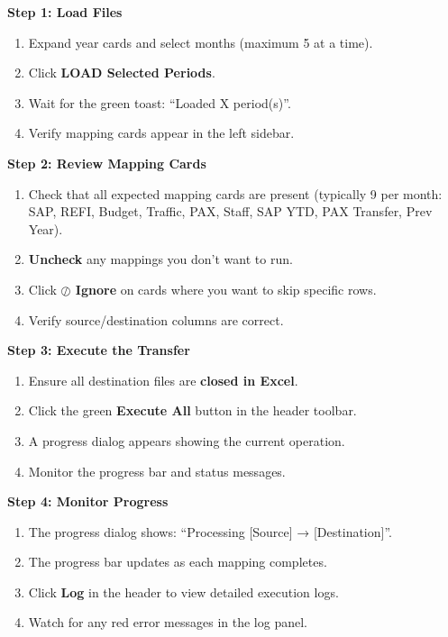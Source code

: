 \documentclass[11pt,a4paper]{article}
\begin{document}
\begin{stepbox}
\textbf{Step 1: Load Files}
\begin{enumerate}[leftmargin=*, itemsep=4pt]
\item Expand year cards and select months (maximum 5 at a time).
\item Click \textbf{LOAD Selected Periods}.
\item Wait for the green toast: ``Loaded X period(s)''.
\item Verify mapping cards appear in the left sidebar.
\end{enumerate}

\textbf{Step 2: Review Mapping Cards}
\begin{enumerate}[leftmargin=*, itemsep=4pt]
\item Check that all expected mapping cards are present (typically 9 per month: SAP, REFI, Budget, Traffic, PAX, Staff, SAP YTD, PAX Transfer, Prev Year).
\item \textbf{Uncheck} any mappings you don't want to run.
\item Click \textbf{$\oslash$ Ignore} on cards where you want to skip specific rows.
\item Verify source/destination columns are correct.
\end{enumerate}

\textbf{Step 3: Execute the Transfer}
\begin{enumerate}[leftmargin=*, itemsep=4pt]
\item Ensure all destination files are \textbf{closed in Excel}.
\item Click the green \textbf{Execute All} button in the header toolbar.
\item A progress dialog appears showing the current operation.
\item Monitor the progress bar and status messages.
\end{enumerate}

\textbf{Step 4: Monitor Progress}
\begin{enumerate}[leftmargin=*, itemsep=4pt]
\item The progress dialog shows: ``Processing [Source] → [Destination]''.
\item The progress bar updates as each mapping completes.
\item Click \textbf{Log} in the header to view detailed execution logs.
\item Watch for any red error messages in the log panel.
\end{enumerate}


\end{stepbox}
\end{document}
